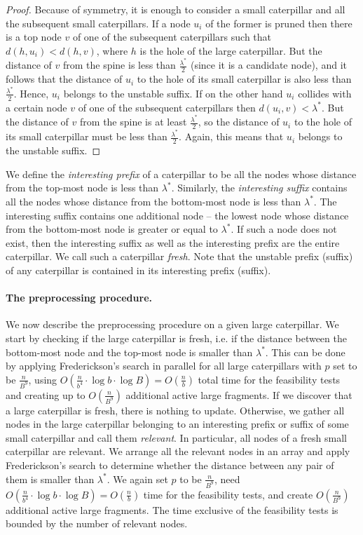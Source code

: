 \documentclass[11pt,a4paper]{article}
\theoremstyle{definition}
\theoremstyle{remark}
\begin{document}
\begin{proof}
Because of symmetry, it is enough to consider a small caterpillar and all the subsequent
small caterpillars. If a node $u_{i}$ of the former is pruned then there is a top node
$v$ of one of the subsequent caterpillars such that $d(h,u_{i}) < d(h,v)$, where $h$ is the hole
of the large caterpillar. But the distance of $v$ from the spine is less than $\frac{\lambda^{*}}{2}$ (since it is a candidate node),
 and it follows that the distance of $u_{i}$ to the hole of its small caterpillar is also less
than $\frac{\lambda^{*}}{2}$. Hence, $u_{i}$ belongs to the unstable suffix.
If on the other hand $u_{i}$ collides with a certain node $v$ of one of the subsequent
caterpillars then $d(u_{i},v)<\lambda^{*}$. But the distance of $v$ from the spine is at least
$\frac{\lambda^{*}}{2}$, so the distance of $u_{i}$ to the hole of its small caterpillar must be
less than $\frac{\lambda^{*}}{2}$. Again, this means that $u_{i}$ belongs to the unstable suffix.
\end{proof}

We define the \emph{interesting prefix} of a caterpillar to be all the nodes whose distance from the top-most node is less than $\lambda^*$.
Similarly, the \emph{interesting suffix} contains all the nodes whose distance from the bottom-most node is less than $\lambda^*$. The interesting suffix contains one additional node -- the lowest node whose distance from the bottom-most node is greater or equal to $\lambda^*$. If such a node does not exist, then the interesting suffix as well as the interesting prefix are the entire caterpillar. We call such a caterpillar \emph{fresh}. Note that the unstable prefix (suffix) of any caterpillar is contained in its interesting prefix (suffix).

\paragraph{The preprocessing procedure.}
We now describe the preprocessing procedure on a given large caterpillar. We start by checking if the large caterpillar is fresh, i.e. if the distance between the bottom-most node and the top-most node is smaller than $\lambda^*$. This can be
done by applying Frederickson's search in parallel for all large caterpillars with $p$ set to
be $\frac{n}{B^{9}}$, using $O(\frac{n}{b^{4}}\cdot \log b \cdot \log B)=O(\frac{n}{b})$
total time for the feasibility tests and creating up to $O(\frac{n}{B^{9}})$ additional active large
fragments. If we discover that a large caterpillar is fresh, there is nothing to update. 
Otherwise, we gather all nodes in the large caterpillar belonging to
an interesting prefix or suffix of some small caterpillar and call them \emph{relevant}. In particular,
all nodes of a fresh small caterpillar are relevant.
We arrange all the relevant nodes in an array and apply Frederickson's search to determine whether the distance between any pair of them is smaller than $\lambda^*$. We again
set $p$ to be $\frac{n}{B^{9}}$, need $O(\frac{n}{b^{4}}\cdot \log b \cdot \log B)=O(\frac{n}{b})$
time for the feasibility tests, and create $O(\frac{n}{B^{9}})$ additional active large fragments.
The time exclusive of the feasibility tests is bounded by the number of relevant nodes.
\end{document}
